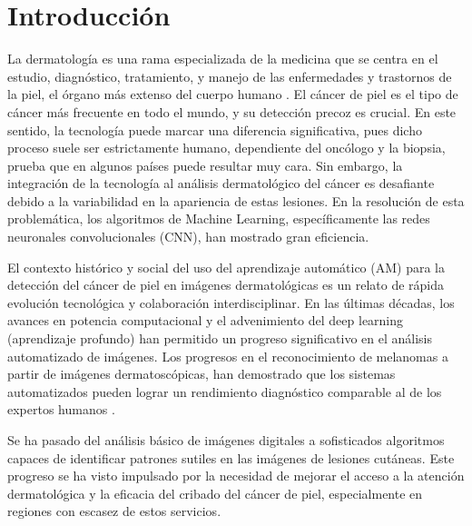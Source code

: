 \chapter*{Introducción}\label{chapter:introduction}

    La dermatología es una rama especializada de la medicina que se centra en el estudio, diagnóstico, tratamiento, y manejo de las enfermedades y trastornos de la piel, el órgano más extenso del cuerpo humano . El cáncer de piel es el tipo de cáncer más frecuente en todo el mundo, y su detección precoz es crucial. En este sentido, la tecnología puede marcar una diferencia significativa, pues dicho proceso suele ser estrictamente humano, dependiente del oncólogo y la biopsia, prueba que en algunos países puede resultar muy cara. Sin embargo, la integración de la tecnología al análisis dermatológico del cáncer es desafiante debido a la variabilidad en la apariencia de estas lesiones. En la resolución de esta problemática, los algoritmos de Machine Learning, específicamente las redes neuronales convolucionales (CNN), han mostrado gran eficiencia.


    El contexto histórico y social del uso del aprendizaje automático (AM) para la detección del cáncer de piel en imágenes dermatológicas es un relato de rápida evolución tecnológica y colaboración interdisciplinar. En las últimas décadas, los avances en potencia computacional y el advenimiento del deep learning (aprendizaje profundo) han permitido un progreso significativo en el análisis automatizado de imágenes. Los progresos en el reconocimiento de melanomas a partir de imágenes dermatoscópicas, han demostrado que los sistemas automatizados pueden lograr un rendimiento diagnóstico comparable al de los expertos humanos .

    Se ha pasado del análisis básico de imágenes digitales a sofisticados algoritmos capaces de identificar patrones sutiles en las imágenes de lesiones cutáneas. Este progreso se ha visto impulsado por la necesidad de mejorar el acceso a la atención dermatológica y la eficacia del cribado del cáncer de piel, especialmente en regiones con escasez de estos servicios. 

